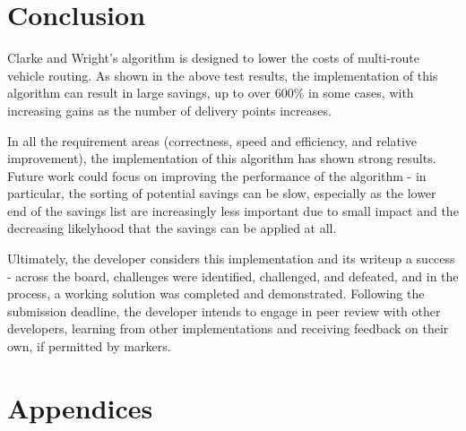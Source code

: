 \documentclass[a4paper]{article}
\begin{document}
    \section{Conclusion}
    Clarke and Wright's algorithm is designed to lower the costs of multi-route vehicle routing. As shown in the above test results, the implementation of this
    algorithm can result in large savings, up to over 600\% in some cases, with increasing gains as the number of delivery points increases.

    In all the requirement areas (correctness, speed and efficiency, and relative improvement), the implementation of this algorithm has shown strong results.
    Future work could focus on improving the performance of the algorithm - in particular, the sorting of potential savings can be slow, especially as the lower
    end of the savings list are increasingly less important due to small impact and the decreasing likelyhood that the savings can be applied at all.

    Ultimately, the developer considers this implementation and its writeup a success - across the board, challenges were identified, challenged, and defeated,
    and in the process, a working solution was completed and demonstrated. Following the submission deadline, the developer intends to engage in peer review
    with other developers, learning from other implementations and receiving feedback on their own, if permitted by markers.

    
    
    
    \section{Appendices}
\end{document}
